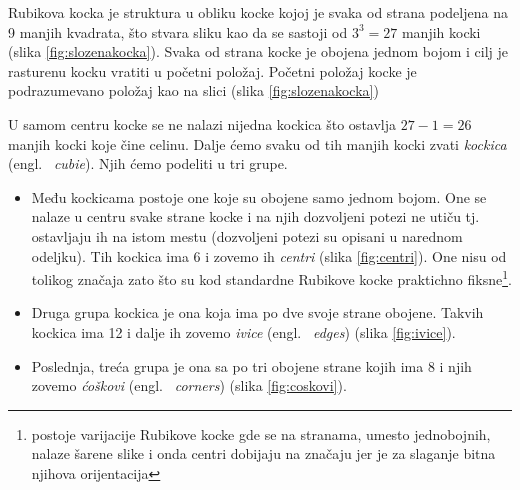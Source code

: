\documentclass[a4paper]{article}
\begin{document}
Rubikova kocka je struktura u obliku kocke kojoj je svaka od strana podeljena na 9 manjih kvadrata, što stvara sliku kao da se sastoji od $3^3 = 27$ manjih kocki (slika \ref{fig:slozenakocka}).
Svaka od strana kocke je obojena jednom bojom i cilj je rasturenu kocku vratiti u početni položaj. Početni položaj kocke je podrazumevano položaj kao na slici (slika \ref{fig:slozenakocka})

U samom centru kocke se ne nalazi nijedna kockica što ostavlja $27 - 1 = 26$ manjih kocki koje čine celinu. Dalje ćemo svaku od tih manjih kocki zvati \textit{kockica} (engl. ~{\em cubie}).
Njih ćemo podeliti u tri grupe.    
    
    \begin{figure}[h]
        \centering
        \caption{}
        \label{fig:kockice}
    \end{figure}
    
\begin{itemize}
\item Među kockicama postoje one koje su obojene samo jednom bojom.
    One se nalaze u centru svake strane kocke i na njih dozvoljeni potezi ne utiču tj. ostavljaju ih na istom mestu (dozvoljeni potezi su opisani u narednom odeljku).
    Tih kockica ima 6 i zovemo ih \textit{centri} (slika \ref{fig:centri}). One nisu od tolikog značaja zato što su kod standardne Rubikove kocke praktichno fiksne\footnote{postoje varijacije Rubikove kocke gde se na stranama, umesto jednobojnih, nalaze šarene slike i onda centri dobijaju na značaju jer je za slaganje bitna njihova orijentacija}.
\item Druga grupa kockica je ona koja ima po dve svoje strane obojene.
    Takvih kockica ima 12 i dalje ih zovemo \textit{ivice} (engl. ~{\em edges}) (slika \ref{fig:ivice}).
\item Poslednja, treća grupa je ona sa po tri obojene strane kojih ima 8 i njih zovemo \textit{ćoškovi} (engl. ~{\em corners}) (slika \ref{fig:coskovi}).
\end{itemize} 
\end{document}

